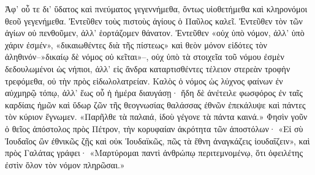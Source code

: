 \documentclass[10pt]{book}
\newcommand{\switchenglish}{\selectlanguage{english} \switchcolumn}
\begin{document}
\begin{paracol}{2}
Ἀφ’ οὗ τε δι’ ὕδατος καὶ πνεύματος γεγεννήμεθα, ὄντως υἱοθετήμεθα καὶ κληρονόμοι θεοῦ γεγενήμεθα.
Ἐντεῦθεν τοὺς πιστοὺς ἁγίους ὁ Παῦλος καλεῖ.
Ἐντεῦθεν τὸν τῶν ἁγίων οὐ πενθοῦμεν, ἀλλ’ ἑορτάζομεν θάνατον.
Ἐντεῦθεν «οὐχ ὑπὸ νόμον, ἀλλ’ ὑπὸ χάριν ἐσμέν», «δικαιωθέντες διὰ τῆς πίστεως» καὶ θεὸν μόνον εἰδότες τὸν ἀληθινόν–»δικαίῳ δὲ νόμος οὐ κεῖται»–, οὐχ ὑπὸ τὰ στοιχεῖα τοῦ νόμου ἐσμὲν δεδουλωμένοι ὡς νήπιοι, ἀλλ’ εἰς ἄνδρα καταρτισθέντες τέλειον στερεὰν τροφὴν τρεφόμεθα, οὐ τὴν πρὸς εἰδωλολατρείαν.
Καλὸς ὁ νόμος ὡς λύχνος φαίνων ἐν αὐχμηρῷ τόπῳ, ἀλλ’ ἕως οὗ ἡ ἡμέρα διαυγάσῃ· ἤδη δὲ ἀνέτειλε φωσφόρος ἐν ταῖς καρδίαις ἡμῶν καὶ ὕδωρ ζῶν τῆς θεογνωσίας θαλάσσας ἐθνῶν ἐπεκάλυψε καὶ πάντες τὸν κύριον ἔγνωμεν.
«Παρῆλθε τὰ παλαιά, ἰδοὺ γέγονε τὰ πάντα καινά.» Φησὶν γοῦν ὁ θεῖος ἀπόστολος πρὸς Πέτρον, τὴν κορυφαίαν ἀκρότητα τῶν ἀποστόλων· «Εἰ σὺ Ἰουδαῖος ὢν ἐθνικῶς ζῇς καὶ οὐκ Ἰουδαϊκῶς, πῶς τὰ ἔθνη ἀναγκάζεις ἰουδαΐζειν», καὶ πρὸς Γαλάτας γράφει· «Μαρτύρομαι παντὶ ἀνθρώπῳ περιτεμνομένῳ, ὅτι ὀφειλέτης ἐστὶν ὅλον τὸν νόμον πληρῶσαι.»

\switchenglish


\end{paracol}
\end{document}
